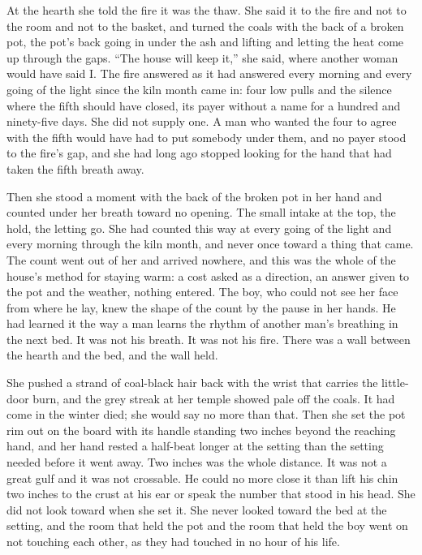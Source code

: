 \scenebreak

At the hearth she told the fire it was the thaw. She said it to the fire and not to the room and not to the basket, and turned the coals with the back of a broken pot, the pot's back going in under the ash and lifting and letting the heat come up through the gaps. “The house will keep it,” she said, where another woman would have said I. The fire answered as it had answered every morning and every going of the light since the kiln month came in: four low pulls and the silence where the fifth should have closed, its payer without a name for a hundred and ninety-five days. She did not supply one. A man who wanted the four to agree with the fifth would have had to put somebody under them, and no payer stood to the fire's gap, and she had long ago stopped looking for the hand that had taken the fifth breath away.

Then she stood a moment with the back of the broken pot in her hand and counted under her breath toward no opening. The small intake at the top, the hold, the letting go. She had counted this way at every going of the light and every morning through the kiln month, and never once toward a thing that came. The count went out of her and arrived nowhere, and this was the whole of the house's method for staying warm: a cost asked as a direction, an answer given to the pot and the weather, nothing entered. The boy, who could not see her face from where he lay, knew the shape of the count by the pause in her hands. He had learned it the way a man learns the rhythm of another man's breathing in the next bed. It was not his breath. It was not his fire. There was a wall between the hearth and the bed, and the wall held.

She pushed a strand of coal-black hair back with the wrist that carries the little-door burn, and the grey streak at her temple showed pale off the coals. It had come in the winter  died; she would say no more than that. Then she set the pot rim out on the board with its handle standing two inches beyond the reaching hand, and her hand rested a half-beat longer at the setting than the setting needed before it went away. Two inches was the whole distance. It was not a great gulf and it was not crossable. He could no more close it than lift his chin two inches to the crust at his ear or speak the number that stood in his head. She did not look toward  when she set it. She never looked toward the bed at the setting, and the room that held the pot and the room that held the boy went on not touching each other, as they had touched in no hour of his life.

